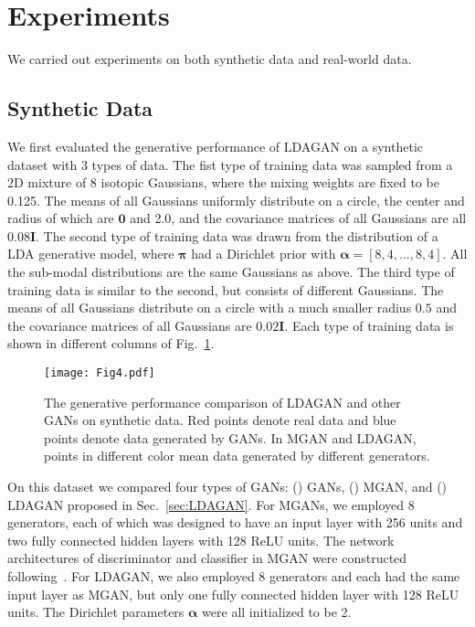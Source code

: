 \documentclass{article}
\begin{document}
\section{Experiments}
\label{sec:Experiments}
We carried out experiments on both synthetic data and real-world data.

\subsection{Synthetic Data}
We first evaluated the generative performance of LDAGAN on a synthetic dataset with 3 types of data.
The fist type of training data was sampled from a 2D mixture of 8 isotopic Gaussians, where the mixing weights are fixed to be 0.125.
The means of all Gaussians uniformly distribute on a circle, the center and radius of which are $\mathbf{0}$ and 2.0, and the covariance matrices of all Gaussians are all $0.08\mathbf{I}$.
The second type of training data was drawn from the distribution of a LDA generative model, where $\bm{\pi}$ had a Dirichlet prior with $\bm{\alpha} = [8,4,...,8,4]$.
All the sub-modal distributions are the same Gaussians as above.
The third type of training data is similar to the second, but consists of different Gaussians.
The means of all Gaussians distribute on a circle with a much smaller radius $0.5$ and the covariance matrices of all Gaussians are $0.02\mathbf{I}$.
Each type of training data is shown in different columns of Fig.~\ref{fig:Synth}.


\begin{figure}
  \centering
    \texttt{[image: Fig4.pdf]}
     \caption{The generative performance comparison of LDAGAN and other GANs on synthetic data. Red points denote real data and blue points denote data generated by GANs. In MGAN and LDAGAN, points in different color mean data generated by different generators.}
     \label{fig:Synth}
\end{figure}

On this dataset we compared four types of GANs: ()  GANs, ()  MGAN, and ()  LDAGAN proposed in Sec.~\ref{sec:LDAGAN}.
For MGANs, we employed 8 generators, each of which was designed to have an input layer with 256 units and two fully connected hidden layers with 128 ReLU units.
The network architectures of discriminator and classifier in MGAN were constructed following~\cite{hoang2018mgan}.
For LDAGAN, we also employed 8 generators and each had the same input layer as MGAN, but only one fully connected hidden layer with 128 ReLU units.
The Dirichlet parameters $\bm{\alpha}$ were all initialized to be 2.
\end{document}
